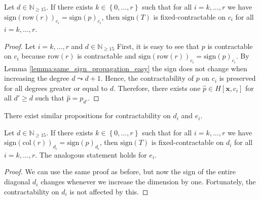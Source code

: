 \begin{proposition}\label{prop:fixed-contraction-homo-row}
    Let \( d \in \mathbb{N}_{\geq 15} \). If there exists \( k \in \left\{ 0, \dots, r \right\} \) such that for all \( i = k, \dots, r\) we have \(  \mathrm{sign}(\mathrm{row}(r))_{c_i} = \mathrm{sign}(p)_{c_i} \),
    then  \( \mathrm{sign}(T) \) is fixed-contractable on \( c_i \) for all \( i = k, \dots, r \).
\end{proposition}

\begin{proof}
    Let \( i = k, \dots, r \) and \( d \in \mathbb{N}_{\geq 15} \)
    First, it is easy to see that \( p \) is contractable on \( c_i \) because \( \mathrm{row}(r) \) is contractable and \( \mathrm{sign}(\mathrm{row}(r))_{c_i} = \mathrm{sign}(p)_{c_i} \). By Lemma \ref{lemma:same_sign_propagation_easy} the sign does not change when increasing the degree \( d \leadsto d+1 \). Hence, the contractability of \( p \) on \( c_i \) is preserved for all degrees greater or equal to \( d \). Therefore, there exists one \( \hat p \in H[\mathbf{x}, c_i] \) for all \( d' \geq d \) such that \( \hat p = p_{d'} \).
\end{proof}

There exist similar propositions for contractability on \( d_i \) and \( e_i \).

\begin{proposition}
    Let \( d \in \mathbb{N}_{\geq 15} \). If there exists \( k \in \left\{ 0, \dots, r \right\} \) such that for all \( i = k, \dots, r\) we have \(  \mathrm{sign}(\mathrm{col}(r))_{d_i} = \mathrm{sign}(p)_{d_i} \),
then  \( \mathrm{sign}(T) \) is fixed-contractable on \( d_i \) for all \( i = k, \dots, r \). The analogous statement holds for \( e_i \).
\end{proposition}

\begin{proof}
    We can use the same proof as before, but now the sign of the entire diagonal $d_{i}$ changes whenever we increase the dimension by one. Fortunately, the contractability on $d_{i}$ is not affected by this. 
\end{proof}
